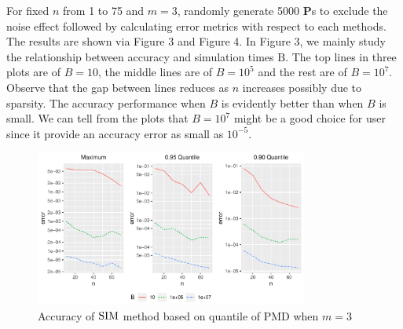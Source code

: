 \documentclass[12pt]{article}
\newcommand{\Pmat}{\mathbf{P}}
\newcommand{\PMD}{\textrm{PMD}}
\newcommand{\SIM}{{\rm SIM}}
\begin{document}
For fixed $n$ from 1 to 75 and $m=3$, randomly generate 5000 $\Pmat$s to exclude the noise effect followed by calculating error metrics with respect to each methods. The results are shown via Figure 3 and Figure 4. In Figure 3, we mainly study the relationship between accuracy and simulation times $\mbox{B}$. The top lines in three plots are of $B=10$,  the middle lines are of $B=10^5$ and the rest are of $B=10^7$. Observe that the gap between lines reduces as $n$ increases possibly due to sparsity. The accuracy performance when $B$ is evidently better than when $B$ is small. We can tell from the plots that $B=10^7$ might be a good choice for user since it provide an accuracy error as small as $10^{-5}$.
\begin{figure}[h]
	\centering
	\includegraphics[width=0.8\textwidth]{figures/simulation.pdf}
	\caption{Accuracy of $\SIM$ method based on quantile of $\PMD$ when $m=3$}
	\label{fig: dft accuracy}
\end{figure}
\end{document}
